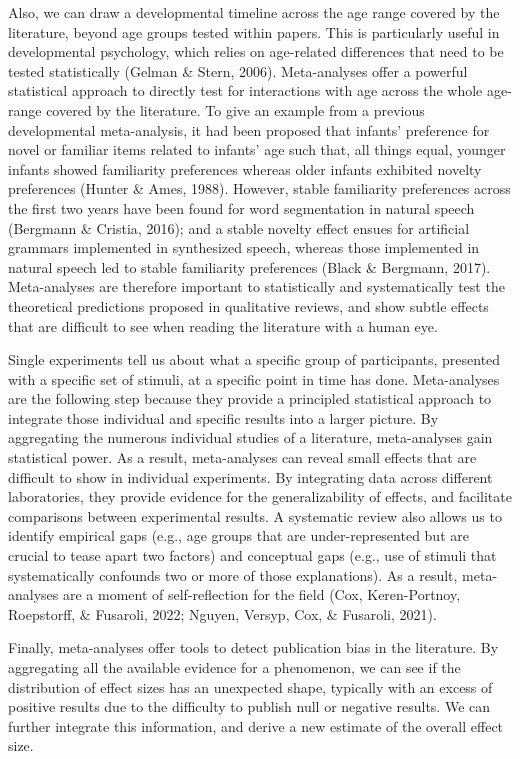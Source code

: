 \documentclass[
  man,mask,floatsintext]{apa6}
\begin{document}
Also, we can draw a developmental timeline across the age range covered by the literature, beyond age groups tested within papers. This is particularly useful in developmental psychology, which relies on age-related differences that need to be tested statistically (Gelman \& Stern, 2006). Meta-analyses offer a powerful statistical approach to directly test for interactions with age across the whole age-range covered by the literature. To give an example from a previous developmental meta-analysis, it had been proposed that infants' preference for novel or familiar items related to infants' age such that, all things equal, younger infants showed familiarity preferences whereas older infants exhibited novelty preferences (Hunter \& Ames, 1988). However, stable familiarity preferences across the first two years have been found for word segmentation in natural speech (Bergmann \& Cristia, 2016); and a stable novelty effect ensues for artificial grammars implemented in synthesized speech, whereas those implemented in natural speech led to stable familiarity preferences (Black \& Bergmann, 2017). Meta-analyses are therefore important to statistically and systematically test the theoretical predictions proposed in qualitative reviews, and show subtle effects that are difficult to see when reading the literature with a human eye.

Single experiments tell us about what a specific group of participants, presented with a specific set of stimuli, at a specific point in time has done. Meta-analyses are the following step because they provide a principled statistical approach to integrate those individual and specific results into a larger picture. By aggregating the numerous individual studies of a literature, meta-analyses gain statistical power. As a result, meta-analyses can reveal small effects that are difficult to show in individual experiments. By integrating data across different laboratories, they provide evidence for the generalizability of effects, and facilitate comparisons between experimental results. A systematic review also allows us to identify empirical gaps (e.g., age groups that are under-represented but are crucial to tease apart two factors) and conceptual gaps (e.g., use of stimuli that systematically confounds two or more of those explanations). As a result, meta-analyses are a moment of self-reflection for the field (Cox, Keren-Portnoy, Roepstorff, \& Fusaroli, 2022; Nguyen, Versyp, Cox, \& Fusaroli, 2021).

Finally, meta-analyses offer tools to detect publication bias in the literature. By aggregating all the available evidence for a phenomenon, we can see if the distribution of effect sizes has an unexpected shape, typically with an excess of positive results due to the difficulty to publish null or negative results. We can further integrate this information, and derive a new estimate of the overall effect size.
\end{document}
